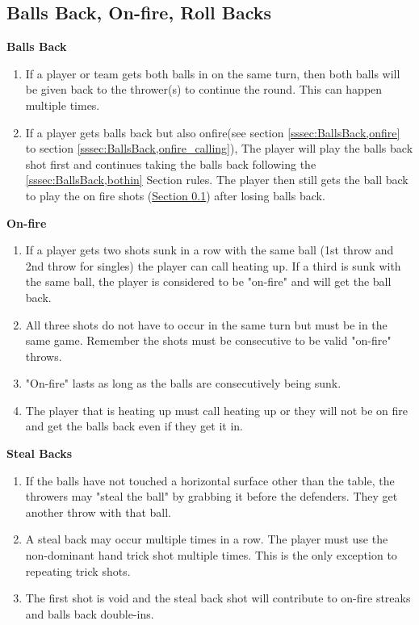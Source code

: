 	\subsection{Balls Back, On-fire, Roll Backs}\label{ssec:BallsBack}
        \noindent\textbf{Balls Back}
        \begin{enumerate}[label=(\roman*)]
            \item \label{sssec:BallsBack,bothin} If a player or team gets both balls in on the same turn, then both balls will be given back to the thrower(s) to continue the round.
                This can happen multiple times.
            \item \label{sssec:BallsBack,onfire_combine} If a player gets balls back but also onfire(see section \ref{sssec:BallsBack,onfire} to section \ref{sssec:BallsBack,onfire_calling}), The player will play the balls back shot first and continues taking the balls back following the \ref{sssec:BallsBack,bothin} Section rules.
                The player then still gets the ball back to play the on fire shots (\hyperref[ssec:BallsBack]{Section \ref{ssec:BallsBack}}) after losing balls back.
        \end{enumerate}
        \noindent\textbf{On-fire}
        \begin{enumerate}[label=(\roman*)]
            \item \label{sssec:BallsBack,onfire} If a player gets two shots sunk in a row with the same ball (1st throw and 2nd throw for singles) the player can call heating up.
                If a third is sunk with the same ball, the player is considered to be "on-fire" and will get the ball back. 
            \item \label{sssec:BallsBack,onfire_reset} All three shots do not have to occur in the same turn but must be in the same game. Remember the shots must be consecutive to be valid "on-fire" throws.
            \item \label{sssec:BallsBack,onfire_multiple} "On-fire" lasts as long as the balls are consecutively being sunk. 
            \item \label{sssec:BallsBack,onfire_calling} The player that is heating up must call heating up or they will not be on fire and get the balls back even if they get it in.
        \end{enumerate}
		
        \noindent\textbf{Steal Backs}
        \begin{enumerate}[label=(\roman*)]
            \item \label{sssec:BallsBack,stealback} If the balls have not touched a horizontal surface other than the table, the throwers may "steal the ball" by grabbing it before the defenders.
                They get another throw with that ball.
            \item \label{sssec:BallsBack,stealback_multi} A steal back may occur multiple times in a row.
                The player must use the non-dominant hand trick shot multiple times. This is the only exception to repeating trick shots.
            \item \label{sssec:BallsBack,stealback_redo} The first shot is void and the steal back shot will contribute to on-fire streaks and balls back double-ins.
        \end{enumerate}
